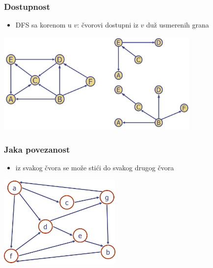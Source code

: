 \documentclass[compress]{beamer}
\begin{document}
\begin{frame}[fragile]
  \frametitle{Dostupnost}
  \begin{itemize}
    \item DFS  sa korenom u $v$: čvorovi dostupni iz $v$
      duž usmerenih grana 
  \end{itemize}
  \begin{center}
    \includegraphics[width=10cm]{asp-14-pic31.png}
  \end{center}
\end{frame}

\begin{frame}[fragile]
  \frametitle{Jaka povezanost}
  \begin{itemize}
    \item iz svakog čvora se može stići do svakog drugog čvora
  \end{itemize}
  \begin{center}
    \includegraphics[width=6cm]{asp-14-pic32.png}
  \end{center}
\end{frame}
\end{document}
